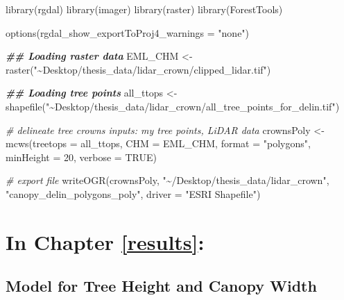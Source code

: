 \documentclass[12pt,twoside]{reedthesis}
\newenvironment{Shaded}{\begin{snugshade}}{\end{snugshade}}
\newcommand{\AttributeTok}[1]{\textcolor[rgb]{0.77,0.63,0.00}{#1}}
\newcommand{\CommentTok}[1]{\textcolor[rgb]{0.56,0.35,0.01}{\textit{#1}}}
\newcommand{\ConstantTok}[1]{\textcolor[rgb]{0.00,0.00,0.00}{#1}}
\newcommand{\DecValTok}[1]{\textcolor[rgb]{0.00,0.00,0.81}{#1}}
\newcommand{\DocumentationTok}[1]{\textcolor[rgb]{0.56,0.35,0.01}{\textbf{\textit{#1}}}}
\newcommand{\FunctionTok}[1]{\textcolor[rgb]{0.00,0.00,0.00}{#1}}
\newcommand{\NormalTok}[1]{#1}
\newcommand{\OtherTok}[1]{\textcolor[rgb]{0.56,0.35,0.01}{#1}}
\newcommand{\StringTok}[1]{\textcolor[rgb]{0.31,0.60,0.02}{#1}}
\begin{document}
\footnotesize
\begin{Shaded}
\begin{Highlighting}[]
\FunctionTok{library}\NormalTok{(rgdal)}
\FunctionTok{library}\NormalTok{(imager)}
\FunctionTok{library}\NormalTok{(raster)}
\FunctionTok{library}\NormalTok{(ForestTools)}

\FunctionTok{options}\NormalTok{(}\AttributeTok{rgdal\_show\_exportToProj4\_warnings =} \StringTok{"none"}\NormalTok{)}

\DocumentationTok{\#\# Loading raster data}
\NormalTok{EML\_CHM }\OtherTok{\textless{}{-}} \FunctionTok{raster}\NormalTok{(}\StringTok{"\textasciitilde{}Desktop/thesis\_data/lidar\_crown/clipped\_lidar.tif"}\NormalTok{)}

\DocumentationTok{\#\# Loading tree points}
\NormalTok{all\_ttops }\OtherTok{\textless{}{-}} \FunctionTok{shapefile}\NormalTok{(}\StringTok{"\textasciitilde{}Desktop/thesis\_data/lidar\_crown/all\_tree\_points\_for\_delin.tif"}\NormalTok{)}

\CommentTok{\# delineate tree crowns inputs: my tree points, LiDAR data}
\NormalTok{crownsPoly }\OtherTok{\textless{}{-}} \FunctionTok{mcws}\NormalTok{(}\AttributeTok{treetops =}\NormalTok{ all\_ttops, }\AttributeTok{CHM =}\NormalTok{ EML\_CHM, }\AttributeTok{format =} \StringTok{"polygons"}\NormalTok{,}
    \AttributeTok{minHeight =} \DecValTok{20}\NormalTok{, }\AttributeTok{verbose =} \ConstantTok{TRUE}\NormalTok{)}

\CommentTok{\# export file}
\FunctionTok{writeOGR}\NormalTok{(crownsPoly, }\StringTok{"\textasciitilde{}/Desktop/thesis\_data/lidar\_crown"}\NormalTok{, }\StringTok{"canopy\_delin\_polygons\_poly"}\NormalTok{,}
    \AttributeTok{driver =} \StringTok{"ESRI Shapefile"}\NormalTok{)}
\end{Highlighting}
\end{Shaded}
\hypertarget{in-chapter-refresults}{%
\section{\texorpdfstring{\textbf{In Chapter} \ref{results}\textbf{:}}{In Chapter \ref{results}:}}\label{in-chapter-refresults}}

\hypertarget{model-for-tree-height-and-canopy-width}{%
\subsection*{Model for Tree Height and Canopy Width}\label{model-for-tree-height-and-canopy-width}}
\end{document}
